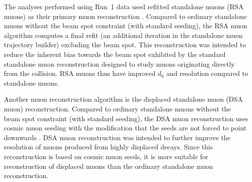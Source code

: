 The analyses performed using Run~1 data used refitted standalone muons (RSA muons) as their primary muon reconstruction \cite{CMS-PAS-EXO-14-012,CMS-AN-14-176}.
Compared to ordinary standalone muons without the beam spot constraint (with standard seeding), the RSA muon algorithm computes a final refit (an additional iteration in the standalone muon trajectory builder) excluding the beam spot.
This reconstruction was intended to reduce the inherent bias towards the beam spot exhibited by the standard standalone muon reconstruction designed to study muons originating directly from the \pp collision.
RSA muons thus have improved $d_0$ and \pT resolution compared to standalone muons.

Another muon reconstruction algorithm is the displaced standalone muon (DSA muon) reconstruction.
Compared to ordinary standalone muons without the beam spot constraint (with standard seeding), the DSA muon reconstruction uses cosmic muon seeding with the modification that the seeds are not forced to point downwards \cite{Liu2008, CMS-DP-2015-015}.
DSA muon reconstruction was intended to further improve the \pT resolution of muons produced from highly displaced decays.
Since this reconstruction is based on cosmic muon seeds, it is more suitable for reconstruction of displaced muons than the ordinary standalone muon reconstruction.

